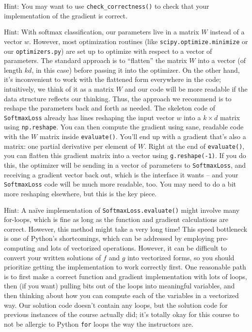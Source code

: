 \documentclass{article}
\begin{document}
Hint: You may want to use \verb|check_correctness()| to check that your implementation of the gradient is correct.

Hint: With softmax classification, our parameters live in a matrix $W$ instead of a vector $w$. However, most optimization routines (like \verb|scipy.optimize.minimize| or our \verb|optimizers.py|) are set up to optimize with respect to a vector of parameters. The standard approach is to ``flatten'' the matrix $W$ into a vector (of length $kd$, in this case) before passing it into the optimizer. On the other hand, it's inconvenient to work with the flattened form everywhere in the code; intuitively, we think of it as a matrix $W$ and our code will be more readable if the data structure reflects our thinking. Thus, the approach we recommend is to reshape the parameters back and forth as needed. The skeleton code of \verb|SoftmaxLoss| already has lines reshaping the input vector $w$ into a $k \times d$ matrix using \verb|np.reshape|. You can then compute the gradient using sane, readable code with the $W$ matrix inside \verb|evaluate()|. You'll end up with a gradient that's also a matrix: one partial derivative per element of $W$. Right at the end of \verb|evaluate()|, you can flatten this gradient matrix into a vector using \verb|g.reshape(-1)|. If you do this, the optimizer will be sending in a vector of parameters to \verb|SoftmaxLoss|, and receiving a gradient vector back out, which is the interface it wants -- and your \verb|SoftmaxLoss| code will be much more readable, too. You may need to do a bit more reshaping elsewhere, but this is the key piece.

Hint: A na\"ive implementation of \verb|SoftmaxLoss.evaluate()| might involve many for-loops, which is fine as long as the function and gradient calculations are correct. However, this method might take a very long time! This speed bottleneck is one of Python's shortcomings, which can be addressed by employing pre-computing and lots of vectorized operations. However, it can be difficult to convert your written solutions of $f$ and $g$ into vectorized forms, so you should prioritize getting the implementation to work correctly first. One reasonable path is to first make a correct function and gradient implementation with lots of loops, then (if you want) pulling bits out of the loops into meaningful variables, and then thinking about how you can compute each of the variables in a vectorized way. Our solution code doesn't contain any loops, but the solution code for previous instances of the course actually did; it's totally okay for this course to not be allergic to Python \verb|for| loops the way the instructors are.
\end{document}
